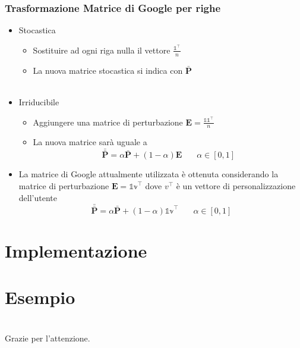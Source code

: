 \documentclass{beamer}
\begin{document}
\begin{frame}
	\frametitle{Trasformazione Matrice di Google per righe}
	\begin{itemize}
		\item Stocastica
		\begin{itemize}
			\item Sostituire ad ogni riga nulla il vettore $\frac{\mathbb{1}^\intercal}{n}$
			\item La nuova matrice stocastica si indica con $\bar{\textbf{P}}$\\~\\
		\end{itemize}
		
		\item Irriducibile
				\begin{itemize}
					\item Aggiungere una matrice di perturbazione $\textbf{E} = \frac{\mathbb{11}^\intercal}{n}$
					\item La nuova matrice sarà uguale a  $$\bar{\bar{\textbf{P}}} = \alpha\bar{\textbf{P}} + (1-\alpha)\textbf{E} ~~~~~~~~ \alpha \in [0,1]$$
				\end{itemize}
	\end{itemize}
\end{frame}

\begin{frame}
	\begin{itemize}
		\item La matrice di Google attualmente utilizzata è ottenuta
		considerando la matrice di perturbazione  $\textbf{E} = \mathbb{1v}^\intercal$ dove $v^\intercal$ è un vettore di personalizzazione dell'utente $$\bar{\bar{\textbf{P}}} = \alpha\bar{\textbf{P}} + (1-\alpha)\mathbb{1v}^\intercal ~~~~~~~~ \alpha \in [0,1]$$
	\end{itemize}
\end{frame}

\section{Implementazione}
\begin{frame}
	
\end{frame}
\begin{frame}
	
\end{frame}
\section{Esempio}
\section{}
\begin{frame}
\begin{center}
Grazie per l'attenzione.
\end{center}
\end{frame}
\end{document}
